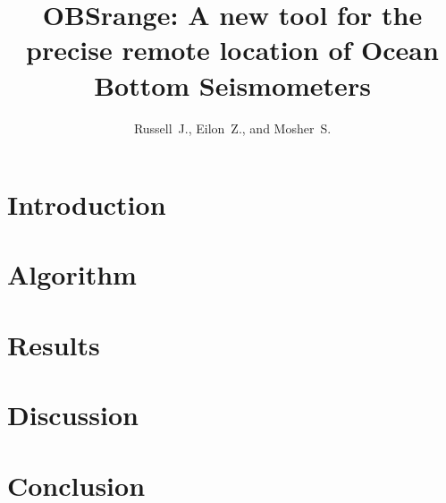 \documentclass[11pt]{amsart}
\title{OBSrange: A new tool for the precise remote location of Ocean Bottom Seismometers}
\author{Russell~J., Eilon~Z., and Mosher~S. }
\begin{document}
\maketitle

\section{Introduction}


\section{Algorithm }


\section{Results }


\section{Discussion }


\section{Conclusion }


\newpage


\end{document}

